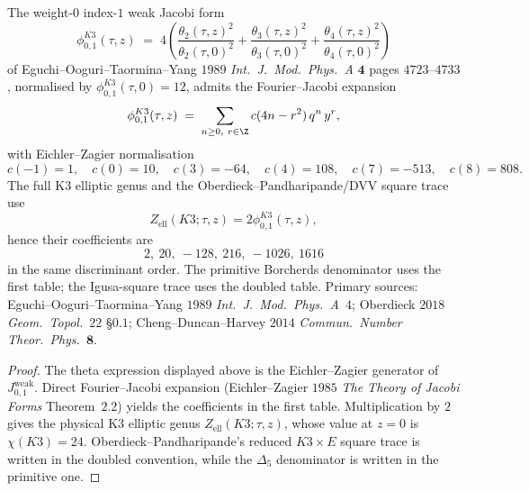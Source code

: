 \begin{proposition}
\label{prop:canonical-oberdieck-phi01}
The weight-$0$ index-$1$ weak Jacobi form
\[
 \phi_{0,1}^{K3}(\tau, z)
 \;=\; 4\left(\frac{\theta_2(\tau,z)^2}{\theta_2(\tau,0)^2}
 + \frac{\theta_3(\tau,z)^2}{\theta_3(\tau,0)^2}
 + \frac{\theta_4(\tau,z)^2}{\theta_4(\tau,0)^2}\right)
\]
of Eguchi--Ooguri--Taormina--Yang $1989$ \emph{Int.~J.~Mod.~Phys.~A}
$\mathbf{4}$ pages $4723$--$4733$, normalised by
$\phi_{0,1}^{K3}(\tau, 0) = 12$, admits the Fourier--Jacobi
expansion
\[
 \phi_{0,1}^{K3}(\tau, z)
 \;=\; \sum_{n\geq 0,\ r\in\Z} c(4n - r^2)\,q^n\,y^r,
\]
with Eichler--Zagier normalisation
\[
 c(-1)=1,\quad c(0) = 10,\quad c(3) = -64,\quad c(4) = 108,\quad
 c(7) = -513,\quad c(8) = 808.
\]
The full K3 elliptic genus and the Oberdieck--Pandharipande/DVV square
trace use
\[
 Z_{\mathrm{ell}}(K3;\tau,z)=2\phi_{0,1}^{K3}(\tau,z),
\]
hence their coefficients are
\[
 2,\ 20,\ -128,\ 216,\ -1026,\ 1616
\]
in the same discriminant order.  The primitive Borcherds denominator
uses the first table; the Igusa-square trace uses the doubled table.
Primary sources: Eguchi--Ooguri--Taormina--Yang $1989$
\emph{Int.~J.~Mod.~Phys.~A~}$4$; Oberdieck $2018$
\emph{Geom.~Topol.~}$22$ \S$0.1$; Cheng--Duncan--Harvey $2014$
\emph{Commun.~Number Theor.~Phys.~}$\mathbf{8}$.
\end{proposition}

\begin{proof}
The theta expression displayed above is the Eichler--Zagier generator
of \(J^{\mathrm{weak}}_{0,1}\). Direct
Fourier--Jacobi expansion \textup{(}Eichler--Zagier $1985$ \emph{The
Theory of Jacobi Forms} Theorem~$2.2$\textup{)} yields the coefficients
in the first table.  Multiplication by \(2\) gives the physical K3 elliptic
genus \(Z_{\mathrm{ell}}(K3;\tau,z)\), whose value at \(z=0\) is
\(\chi(K3)=24\).  Oberdieck--Pandharipande's reduced \(K3\times E\)
square trace is written in the doubled convention, while the
\(\Delta_5\) denominator is written in the primitive one.
\end{proof}

